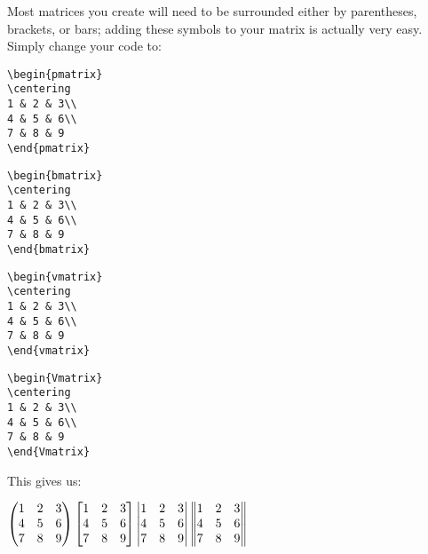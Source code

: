 \documentclass{article}
\begin{document}
Most matrices you create will need to be surrounded either by parentheses, brackets, or bars; adding these symbols to your matrix is actually very easy. Simply change your code to:

\begin{verbatim}
\begin{pmatrix}
\centering
1 & 2 & 3\\
4 & 5 & 6\\
7 & 8 & 9
\end{pmatrix}
\end{verbatim}

\begin{verbatim}
\begin{bmatrix}
\centering
1 & 2 & 3\\
4 & 5 & 6\\
7 & 8 & 9
\end{bmatrix}
\end{verbatim}

\begin{verbatim}
\begin{vmatrix}
\centering
1 & 2 & 3\\
4 & 5 & 6\\
7 & 8 & 9
\end{vmatrix}
\end{verbatim}

\begin{verbatim}
\begin{Vmatrix}
\centering
1 & 2 & 3\\
4 & 5 & 6\\
7 & 8 & 9
\end{Vmatrix}
\end{verbatim}

This gives us: \\
\begin{center}
$\begin{pmatrix}
\centering
1 & 2 & 3\\
4 & 5 & 6\\
7 & 8 & 9
\end{pmatrix} \begin{bmatrix}
\centering
1 & 2 & 3\\
4 & 5 & 6\\
7 & 8 & 9
\end{bmatrix} \begin{vmatrix}
\centering
1 & 2 & 3\\
4 & 5 & 6\\
7 & 8 & 9
\end{vmatrix} \begin{Vmatrix}
\centering
1 & 2 & 3\\
4 & 5 & 6\\
7 & 8 & 9
\end{Vmatrix}$
\end{center}
\end{document}
